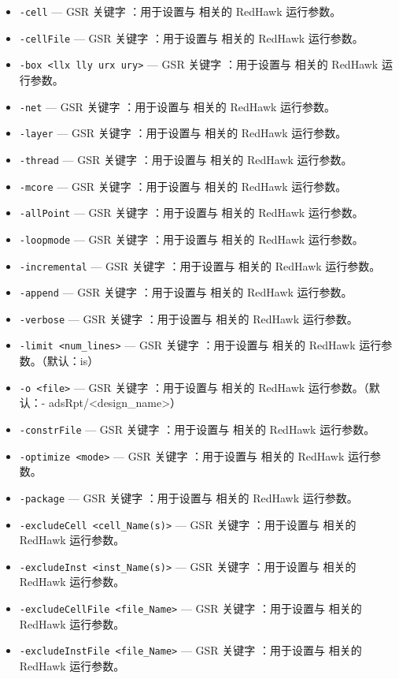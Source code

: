 \begin{itemize}
\item \texttt{-cell} — GSR 关键字 ：用于设置与  相关的 RedHawk 运行参数。
\item \texttt{-cellFile} — GSR 关键字 ：用于设置与  相关的 RedHawk 运行参数。
\item \texttt{-box <llx lly urx ury>} — GSR 关键字 ：用于设置与  相关的 RedHawk 运行参数。
\item \texttt{-net} — GSR 关键字 ：用于设置与  相关的 RedHawk 运行参数。
\item \texttt{-layer} — GSR 关键字 ：用于设置与  相关的 RedHawk 运行参数。
\item \texttt{-thread} — GSR 关键字 ：用于设置与  相关的 RedHawk 运行参数。
\item \texttt{-mcore} — GSR 关键字 ：用于设置与  相关的 RedHawk 运行参数。
\item \texttt{-allPoint} — GSR 关键字 ：用于设置与  相关的 RedHawk 运行参数。
\item \texttt{-loopmode} — GSR 关键字 ：用于设置与  相关的 RedHawk 运行参数。
\item \texttt{-incremental} — GSR 关键字 ：用于设置与  相关的 RedHawk 运行参数。
\item \texttt{-append} — GSR 关键字 ：用于设置与  相关的 RedHawk 运行参数。
\item \texttt{-verbose} — GSR 关键字 ：用于设置与  相关的 RedHawk 运行参数。
\item \texttt{-limit <num\_lines>} — GSR 关键字 ：用于设置与  相关的 RedHawk 运行参数。（默认：is）
\item \texttt{-o <file>} — GSR 关键字 ：用于设置与  相关的 RedHawk 运行参数。（默认：- adsRpt/<design\_name>）
\item \texttt{-constrFile} — GSR 关键字 ：用于设置与  相关的 RedHawk 运行参数。
\item \texttt{-optimize <mode>} — GSR 关键字 ：用于设置与  相关的 RedHawk 运行参数。
\item \texttt{-package} — GSR 关键字 ：用于设置与  相关的 RedHawk 运行参数。
\item \texttt{-excludeCell <cell\_Name(s)>} — GSR 关键字 ：用于设置与  相关的 RedHawk 运行参数。
\item \texttt{-excludeInst <inst\_Name(s)>} — GSR 关键字 ：用于设置与  相关的 RedHawk 运行参数。
\item \texttt{-excludeCellFile <file\_Name>} — GSR 关键字 ：用于设置与  相关的 RedHawk 运行参数。
\item \texttt{-excludeInstFile <file\_Name>} — GSR 关键字 ：用于设置与  相关的 RedHawk 运行参数。

\end{itemize}
